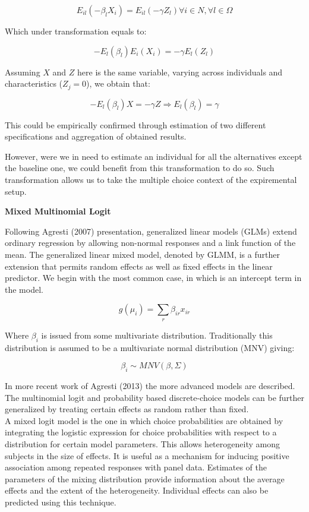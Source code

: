 \documentclass[11pt,]{article}
\begin{document}
\begin{equation}
E_{il} (- \beta_l X_i) = E_{il} (- \gamma Z_l) \forall i \in N, \forall l \in \Omega
\end{equation}

Which under transformation equals to:

\begin{equation}
- E_{l} (\beta_l) E_{i} (X_i) = - \gamma E_{l} (Z_l)
\end{equation}

Assuming \(X\) and \(Z\) here is the same variable, varying across
individuals and characteristics (\(Z_j = 0\)), we obtain that:

\begin{equation}
- E_{l} (\beta_l) X = - \gamma Z \Rightarrow E_{l} (\beta_l) = \gamma
\end{equation}

This could be empirically confirmed through estimation of two different
specifications and aggregation of obtained results.

However, were we in need to estimate an individual for all the
alternatives except the baseline one, we could benefit from this
transformation to do so. Such transformation allows us to take the
multiple choice context of the expiremental setup.

\textbf{Mixed Multinomial Logit}

Following Agresti (2007) presentation, generalized linear models (GLMs)
extend ordinary regression by allowing non-normal responses and a link
function of the mean. The generalized linear mixed model, denoted by
GLMM, is a further extension that permits random effects as well as
fixed effects in the linear predictor. We begin with the most common
case, in which is an intercept term in the model.

\begin{equation}
g(\mu_i) = \sum_r \beta_{ir} x_{ir}
\end{equation}

Where \(\beta_i\) is issued from some multivariate distribution.
Traditionally this distribution is assumed to be a multivariate normal
distribution (MNV) giving:

\begin{equation}
\beta_i \sim MNV(\beta, \Sigma)
\end{equation}

In more recent work of Agresti (2013) the more advanced models are
described. The multinomial logit and probability based discrete-choice
models can be further generalized by treating certain effects as random
rather than fixed.\\
A mixed logit model is the one in which choice probabilities are
obtained by integrating the logistic expression for choice probabilities
with respect to a distribution for certain model parameters. This allows
heterogeneity among subjects in the size of effects. It is useful as a
mechanism for inducing positive association among repeated responses
with panel data. Estimates of the parameters of the mixing distribution
provide information about the average effects and the extent of the
heterogeneity. Individual effects can also be predicted using this
technique.
\end{document}
